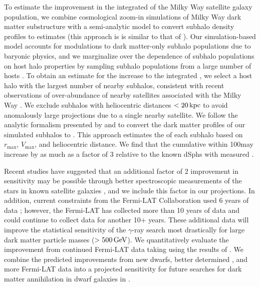 To estimate the improvement in the integrated \Jfactor of the Milky Way satellite galaxy population, we combine cosmological zoom-in simulations of Milky Way dark matter substructure with a semi-analytic model to convert subhalo density profiles to \Jfactor estimates (this approach is is similar to that of \citealt{1309.4780}). 
Our simulation-based model accounts for modulations to dark matter-only subhalo populations due to baryonic physics, and we marginalize over the dependence of subhalo populations on host halo properties by sampling subhalo populations from a large number of hosts \citep{Nadler:2018}. 
To obtain an estimate for the increase to the integrated \Jfactor, we select a host halo with the largest number of nearby subhalos, consistent with recent observations of over-abundance of nearby satellites associated with the Milky Way \citep{Kim:2017iwr, Graus:2018}. 
We exclude subhalos with heliocentric distances $< 20 \mathrm{\,kpc}$ to avoid anomalously large projections due to a single nearby satellite.
We follow the analytic formalism presented by \citet{1604.05599} and \citet{1802.06811} to convert the dark matter profiles of our simulated subhalos to \Jfactors.  
This approach estimates the \Jfactor of each subhalo based on $r_{\max}$, $V_{\max}$, and heliocentric distance. 
We find that the cumulative \Jfactor within 100\kpc may increase by as much as a factor of 3 relative to the known dSphs with measured \Jfactors. 

Recent studies have suggested that an additional factor of 2 improvement in sensitivity may be possible through better spectroscopic measurements  of the stars in known satellite galaxies \citep{Albert:2017}, and we include this factor in our projections.
In addition, current constraints from the Fermi-LAT Collaboration used 6 years of data \citep{Ackermann:2015}; however, the Fermi-LAT has collected more than 10 years of data and could continue to collect data for another 10+ years.
These additional data will improve the statistical sensitivity of the $\gamma$-ray search most drastically for large dark matter particle masses ($>500\mathrm{\,GeV}$).
We quantitatively evaluate the improvement from continued Fermi-LAT data taking using the results of \citep{Charles:2016}.
We combine the predicted improvements from new dwarfs, better determined \Jfactors, and more Fermi-LAT data into a projected sensitivity for future searches for dark matter annihilation in dwarf galaxies in .


